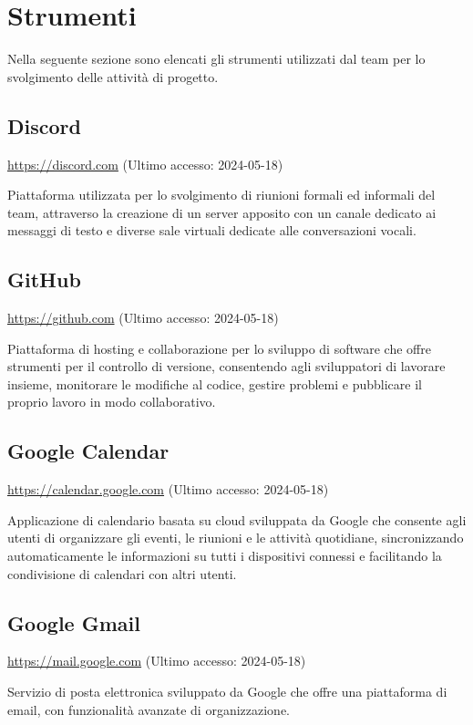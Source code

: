 \section{Strumenti}
\par Nella seguente sezione sono elencati gli strumenti utilizzati dal team per lo svolgimento delle attività di progetto.

\subsection{Discord}
\par \href{https://discord.com}{https://discord.com} (Ultimo accesso: 2024-05-18)
\par Piattaforma utilizzata per lo svolgimento di riunioni formali ed informali del team, attraverso la creazione di un server apposito con un canale dedicato ai messaggi di testo e diverse sale virtuali dedicate alle conversazioni vocali.
    
\subsection{GitHub}
\par \href{https://github.com/}{https://github.com} (Ultimo accesso: 2024-05-18)
\par Piattaforma di hosting e collaborazione per lo sviluppo di software che offre strumenti per il controllo di versione, consentendo agli sviluppatori di lavorare insieme, monitorare le modifiche al codice, gestire problemi e pubblicare il proprio lavoro in modo collaborativo.
    
\subsection{Google Calendar}
\par \href{https://calendar.google.com}{https://calendar.google.com} (Ultimo accesso: 2024-05-18)
\par Applicazione di calendario basata su cloud sviluppata da Google che consente agli utenti di organizzare gli eventi, le riunioni e le attività quotidiane, sincronizzando automaticamente le informazioni su tutti i dispositivi connessi e facilitando la condivisione di calendari con altri utenti.
    
\subsection{Google Gmail}
\par \href{https://mail.google.com}{https://mail.google.com} (Ultimo accesso: 2024-05-18)
\par Servizio di posta elettronica sviluppato da Google che offre una piattaforma di email, con funzionalità avanzate di organizzazione.
    
